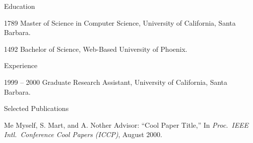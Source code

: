 \begin{vitae}
{\small

\begin{vitaesection}{Education}
\vspace{-0.1cm}
   \item [1789] Master of Science in Computer Science, University of
   California, Santa Barbara.
    
   \item [1492] Bachelor of Science, Web-Based University of Phoenix.

\end{vitaesection}

\begin{vitaesection}{Experience}
\vspace{-0.1cm}
   \item [1999 -- 2000] Graduate Research Assistant, University of California,
    Santa Barbara.

\end{vitaesection}

\begin{vitaesection}{Selected Publications}
   \item Me Myself, S. Mart, and A. Nother Advisor:
   ``Cool Paper Title,'' In
   {\it Proc.\ IEEE Intl.\ Conference Cool Papers 
	(ICCP)}, August 2000.
\vspace{0.3cm}


\end{vitaesection}

}

\end{vitae}

